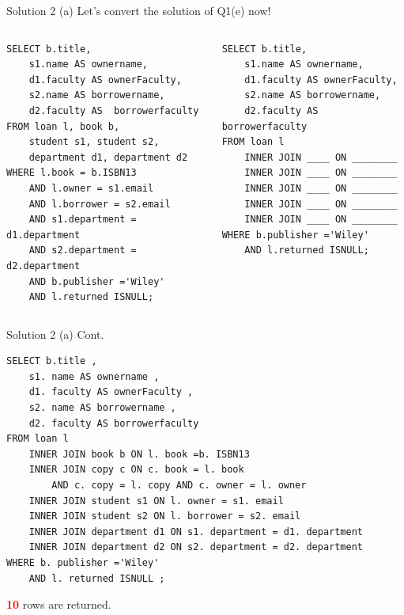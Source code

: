 \begin{frame}[fragile]{Solution 2 (a)}
Let's convert the solution of Q1(e) now!\\
\vspace{10pt}

\begin{columns}

\begin{lstlisting}
SELECT b.title, 
	s1.name AS ownername, 
	d1.faculty AS ownerFaculty, 
	s2.name AS borrowername, 
	d2.faculty AS  borrowerfaculty
FROM loan l, book b,  
	student s1, student s2, 
	department d1, department d2
WHERE l.book = b.ISBN13
	AND l.owner = s1.email
	AND l.borrower = s2.email
	AND s1.department = d1.department
	AND s2.department = d2.department
	AND b.publisher ='Wiley'
	AND l.returned ISNULL;
\end{lstlisting}

\begin{lstlisting}
SELECT b.title, 
	s1.name AS ownername, 
	d1.faculty AS ownerFaculty, 
	s2.name AS borrowername, 
	d2.faculty AS  borrowerfaculty
FROM loan l 
	INNER JOIN ____ ON ________
	INNER JOIN ____ ON ________
	INNER JOIN ____ ON ________
	INNER JOIN ____ ON ________
	INNER JOIN ____ ON ________
WHERE b.publisher ='Wiley'
	AND l.returned ISNULL;
\end{lstlisting}
\end{columns}
	
\end{frame}


\begin{frame}[fragile]{Solution 2 (a) Cont.}
\begin{lstlisting}
SELECT b.title ,
	s1. name AS ownername ,
	d1. faculty AS ownerFaculty ,
	s2. name AS borrowername ,
	d2. faculty AS borrowerfaculty
FROM loan l
	INNER JOIN book b ON l. book =b. ISBN13
	INNER JOIN copy c ON c. book = l. book
		AND c. copy = l. copy AND c. owner = l. owner
	INNER JOIN student s1 ON l. owner = s1. email
	INNER JOIN student s2 ON l. borrower = s2. email
	INNER JOIN department d1 ON s1. department = d1. department
	INNER JOIN department d2 ON s2. department = d2. department
WHERE b. publisher ='Wiley'
	AND l. returned ISNULL ;
\end{lstlisting} 

\textcolor{red}{\textbf{10}} rows are returned.
\end{frame}


